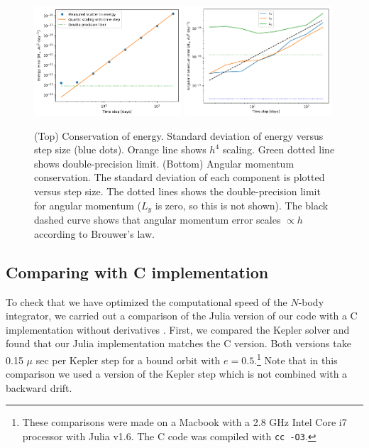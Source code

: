 \documentclass[fleqn,usenatbib,twocolumn]{mnras}
\begin{document}
\begin{figure}
    \centering
    \includegraphics[width=0.49\textwidth]{Energy_error_vs_timestep.png}
    \includegraphics[width=0.49\textwidth]{Angular_momentum_error_vs_timestep.pdf}
    \caption{
    (Top) Conservation of energy.  Standard deviation of energy versus step size (blue dots).  Orange line shows $h^4$ scaling.  Green dotted line shows double-precision limit. (Bottom) Angular momentum conservation.  The standard deviation of each component is plotted versus step size.
     The dotted lines shows the double-precision limit for angular momentum ($L_y$ is zero, so this is not shown).  The black dashed curve shows that angular momentum error scales $\propto h$ according to Brouwer's law.
    }
    \label{fig:energy_conservation}
\end{figure}

\subsection{Comparing with C implementation} \label{sec:c_comparison}

To check that we have optimized the computational speed of the $N$-body integrator,
we carried out a comparison of the Julia version of our code with a C
implementation without derivatives \citep{Hernandez2016}.  First, we compared the Kepler solver \citep{Wisdom2015} and found that our Julia implementation matches the C version.  Both versions take 0.15 $\mu$ sec per Kepler step for a bound orbit with $e=0.5$.\footnote{\label{cpu}These comparisons were made on a Macbook with a 2.8 GHz Intel Core i7 processor with Julia v1.6.  The C code was compiled with \texttt{cc -O3}.}  Note that in this comparison we used a version of the Kepler step which is not combined with a backward drift.
\end{document}
